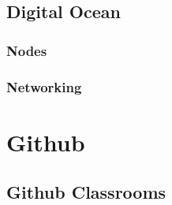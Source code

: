 \subsection{Digital Ocean}\label{sec:digital-ocean}
\subsubsection{Nodes}\label{sec:digital-ocean-nodes}
\subsubsection{Networking}\label{sec:digital-ocean-networking}

\section{Github}\label{sec:github}
\subsection{Github Classrooms}\label{sec:github-classrooms}



